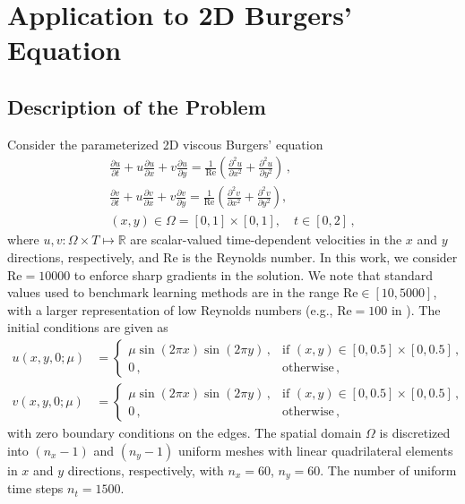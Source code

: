 \section{Application to 2D Burgers' Equation}\label{sec:example}
\subsection{Description of the Problem}
Consider the parameterized 2D viscous Burgers' equation
\begin{subequations}
    \begin{align}
       \frac{\partial u}{\partial t} + u \frac{\partial u}{\partial x} + v \frac{\partial u}{\partial y} = \frac{1}{\mathrm{Re}}\left( \frac{\partial^2 u}{\partial x^2} + \frac{\partial^2 u}{\partial y^2} \right)\,, \\
       \frac{\partial v}{\partial t} + u \frac{\partial v}{\partial x} + v \frac{\partial v}{\partial y} = \frac{1}{\mathrm{Re}}\left( \frac{\partial^2 v}{\partial x^2} + \frac{\partial^2 v}{\partial y^2} \right), \\ (x, y) \in \Omega = [0,1] \times [0, 1], \quad t \in [0, 2]\,,
    \end{align}
\end{subequations}
where $u, v: \Omega \times T \mapsto \mathbb{R}$ are scalar-valued time-dependent velocities in the $x$ and $y$ directions, respectively, and $\mathrm{Re}$ is the Reynolds number. In this work, we consider $\mathrm{Re} = 10000$ to enforce sharp gradients in the solution. We note that standard values used to benchmark learning methods are in the range $\mathrm{Re} \in [10, 5000]$, with a larger representation of low Reynolds numbers (e.g., $\mathrm{Re} = 100$ in \cite{LU2022114778,kovachki2023neural}). The initial conditions are given as
\begin{subequations}
    \begin{align}
        u(x,y,0;\mu) &= \begin{cases}
                \mu \sin(2 \pi x) \sin(2 \pi y)\,, & \text{if } (x, y) \in [0,0.5] \times [0,0.5]\,,\\
                0\,, & \text{otherwise}\,,
            \end{cases} \\
        v(x,y,0;\mu) &= \begin{cases}
                \mu \sin(2 \pi x) \sin(2 \pi y)\,, & \text{if } (x, y) \in [0,0.5] \times [0,0.5]\,,\\
                0\,, & \text{otherwise}\,,
            \end{cases}
    \end{align}
\end{subequations}
with zero boundary conditions on the edges. The spatial domain $\Omega$ is discretized into $(n_x-1)$ and $(n_y-1)$ uniform meshes with linear quadrilateral elements in $x$ and $y$ directions, respectively, with $n_x = 60$, $n_y = 60$. The number of uniform time steps $n_t = 1500$. 

